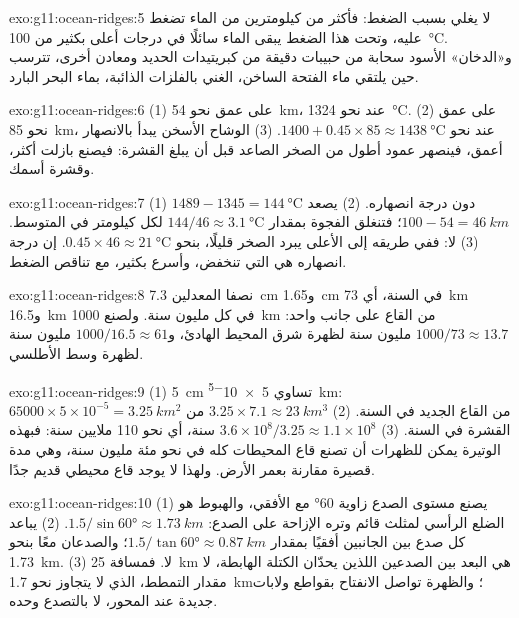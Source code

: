 \begin{solution}{exo:g11:ocean-ridges:5}
لا يغلي بسبب الضغط: فأكثر من كيلومترين من الماء
تضغط عليه، وتحت هذا الضغط يبقى الماء سائلًا في درجات أعلى بكثير من
\qty{100}{\celsius}. و«الدخان» الأسود سحابة من حبيبات دقيقة من كبريتيدات
الحديد ومعادن أخرى، تترسب حين يلتقي ماء الفتحة الساخن، الغني
بالفلزات الذائبة، بماء البحر البارد.
\end{solution}

\begin{solution}{exo:g11:ocean-ridges:6}
(1) على عمق نحو \qty{54}{km}، عند نحو \qty{1324}{\celsius}. (2) على عمق نحو
\qty{85}{km}، عند نحو $1400 + 0.45 \times 85 \approx
\qty{1438}{\celsius}$. (3) الوشاح الأسخن يبدأ بالانصهار أعمق، فينصهر
عمود أطول من الصخر الصاعد قبل أن يبلغ القشرة: فيصنع
بازلت أكثر، وقشرة أسمك.
\end{solution}

\begin{solution}{exo:g11:ocean-ridges:7}
(1) $1489 - 1345 = \qty{144}{\celsius}$ دون درجة انصهاره.
(2) يصعد $100 - 54 = \qty{46}{km}$؛ فتنغلق الفجوة بمقدار
$144/46 \approx \qty{3.1}{\celsius}$ لكل كيلومتر في المتوسط. (3) لا: ففي
طريقه إلى الأعلى يبرد الصخر قليلًا، بنحو $0.45 \times 46 \approx
\qty{21}{\celsius}$. إن درجة انصهاره هي التي تنخفض، وأسرع بكثير،
مع تناقص الضغط.
\end{solution}

\begin{solution}{exo:g11:ocean-ridges:8}
نصفا المعدلين \qty{7.3}{cm} و\qty{1.65}{cm} في السنة، أي
\qty{73}{km} و\qty{16.5}{km} في كل مليون سنة. ولصنع \qty{1000}{km} من
القاع على جانب واحد: $1000/73 \approx 13.7$ مليون سنة لظهرة شرق المحيط
الهادئ، و$1000/16.5 \approx 61$ مليون سنة لظهرة وسط الأطلسي.
\end{solution}

\begin{solution}{exo:g11:ocean-ridges:9}
(1) \qty{5}{cm} تساوي \qty{5e-5}{km}: $65000 \times 5 \times 10^{-5} =
\qty{3.25}{km^2}$ من القاع الجديد في السنة. (2) $3.25 \times 7.1 \approx
\qty{23}{km^3}$ من القشرة في السنة. (3) $3.6 \times 10^8 / 3.25 \approx 1.1
\times 10^8$ سنة، أي نحو 110 ملايين سنة: فبهذه الوتيرة يمكن للظهرات أن
تصنع قاع المحيطات كله في نحو مئة مليون سنة، وهي مدة قصيرة
مقارنة بعمر الأرض. ولهذا لا يوجد قاع محيطي قديم جدًا.
\end{solution}

\begin{solution}{exo:g11:ocean-ridges:10}
(1) يصنع مستوى الصدع زاوية \ang{60} مع الأفقي، والهبوط هو
الضلع الرأسي لمثلث قائم وتره الإزاحة على الصدع:
$1.5/\sin\ang{60} \approx \qty{1.73}{km}$. (2) يباعد كل صدع بين الجانبين
أفقيًا بمقدار $1.5/\tan\ang{60} \approx \qty{0.87}{km}$؛ والصدعان
معًا بنحو \qty{1.73}{km}. (3) لا. فمسافة \qty{25}{km} هي
البعد بين الصدعين اللذين يحدّان الكتلة الهابطة، لا مقدار
التمطط، الذي لا يتجاوز نحو \qty{1.7}{km}؛ والظهرة تواصل الانفتاح
بقواطع ولابات جديدة عند المحور، لا بالتصدع وحده.
\end{solution}

